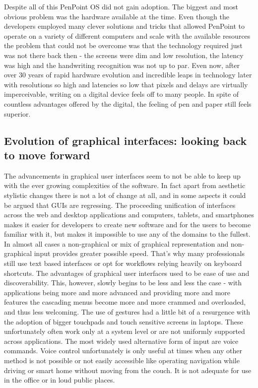 Despite all of this PenPoint OS did not gain adoption. The biggest and most
obvious problem was the hardware available at the time. Even though the
developers employed many clever solutions and tricks that allowed PenPoint to
operate on a variety of different computers and scale with the available
resources the problem that could not be overcome was that the technology
required just was not there back then - the screens were dim and low resolution,
the latency was high and the handwriting recognition was not up to par. Even
now, after over 30 years of rapid hardware evolution and incredible leaps in
technology later with resolutions so high and latencies so low that pixels and
delays are virtually imperceivable, writing on a digital device feels off to
many people. In spite of countless advantages offered by the digital, the
feeling of pen and paper still feels superior.

\subsection{Evolution of graphical interfaces: looking back to move forward}

The advancements in graphical user interfaces seem to not be able to keep up
with the ever growing complexities of the software. In fact apart from
aesthetic stylistic changes there is not a lot of change at all, and in some
aspects it could be argued that GUIs are regressing. The proceeding unification
of interfaces across the web and desktop applications and computers, tablets,
and smartphones makes it easier for developers to create new software and for
the users to become familiar with it, but makes it impossible to use any of the
domains to the fullest. In almost all cases a non-graphical or mix of graphical
representation and non-graphical input provides greater possible speed. That's
why many professionals still use text based interfaces or opt for workflows
relying heavily on keyboard shortcuts. The advantages of graphical user
interfaces used to be ease of use and discoverability. This, however, slowly
begins to be less and less the case - with applications being more and more
advanced and providing more and more features the cascading menus become more
and more crammed and overloaded, and thus less welcoming. The use of gestures
had a little bit of a resurgence with the adoption of bigger touchpads and
touch sensitive screens in laptops. These unfortunately often work only at
a system level or are not uniformly supported across applications. The most
widely used alternative form of input are voice commands. Voice control
unfortunately is only useful at times when any other method is not possible or
not easily accessible like operating navigation while driving or smart home
without moving from the couch. It is not adequate for use in the office or in
loud public places.

